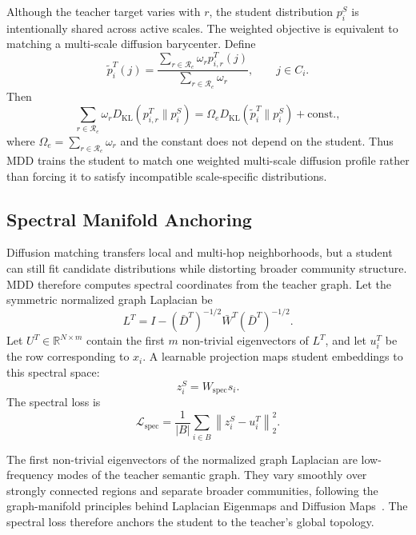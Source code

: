 Although the teacher target varies with $r$, the student distribution $p_i^S$ is intentionally shared across active scales. The weighted objective is equivalent to matching a multi-scale diffusion barycenter. Define
\begin{equation}
    \tilde p_i^T(j)
    =
    \frac{\sum_{r\in\mathcal{R}_e}\omega_r p_{i,r}^T(j)}
    {\sum_{r\in\mathcal{R}_e}\omega_r},
    \qquad j\in C_i.
\end{equation}
Then
\begin{equation}
    \sum_{r\in\mathcal{R}_e}
    \omega_r
    D_{\mathrm{KL}}
    \left(p_{i,r}^{T}\|p_i^{S}\right)
    =
    \Omega_e
    D_{\mathrm{KL}}
    \left(\tilde p_i^T\|p_i^{S}\right)
    +
    \mathrm{const.},
\end{equation}
where $\Omega_e=\sum_{r\in\mathcal{R}_e}\omega_r$ and the constant does not depend on the student. Thus MDD trains the student to match one weighted multi-scale diffusion profile rather than forcing it to satisfy incompatible scale-specific distributions.

\subsection{Spectral Manifold Anchoring}

Diffusion matching transfers local and multi-hop neighborhoods, but a student can still fit candidate distributions while distorting broader community structure. MDD therefore computes spectral coordinates from the teacher graph. Let the symmetric normalized graph Laplacian be
\begin{equation}
    L^T = I - (\bar D^T)^{-1/2}\bar W^T(\bar D^T)^{-1/2}.
\end{equation}
Let $U^T\in\mathbb{R}^{N\times m}$ contain the first $m$ non-trivial eigenvectors of $L^T$, and let $u_i^T$ be the row corresponding to $x_i$. A learnable projection maps student embeddings to this spectral space:
\begin{equation}
    z_i^S = W_{\mathrm{spec}}s_i.
\end{equation}
The spectral loss is
\begin{equation}
    \mathcal{L}_{\mathrm{spec}}
    =
    \frac{1}{|B|}
    \sum_{i\in B}
    \left\|
    z_i^S-u_i^T
    \right\|_2^2.
\end{equation}

The first non-trivial eigenvectors of the normalized graph Laplacian are low-frequency modes of the teacher semantic graph. They vary smoothly over strongly connected regions and separate broader communities, following the graph-manifold principles behind Laplacian Eigenmaps and Diffusion Maps~\citep{belkin2003laplacian,coifman2006diffusionmaps}. The spectral loss therefore anchors the student to the teacher's global topology.

